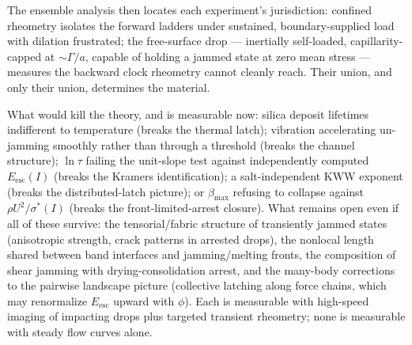 \documentclass[11pt]{article}
\newcommand{\sigmastar}{\sigma^{*}}
\begin{document}
The ensemble analysis then locates each experiment's jurisdiction: confined rheometry isolates the forward ladders under sustained, boundary-supplied load with dilation frustrated; the free-surface drop --- inertially self-loaded, capillarity-capped at $\sim\Gamma/a$, capable of holding a jammed state at zero mean stress --- measures the backward clock rheometry cannot cleanly reach. Their union, and only their union, determines the material.

What would kill the theory, and is measurable now: silica deposit lifetimes indifferent to temperature (breaks the thermal latch); vibration accelerating un-jamming smoothly rather than through a threshold (breaks the channel structure); $\ln\tau$ failing the unit-slope test against independently computed $E_{\mathrm{esc}}(I)$ (breaks the Kramers identification); a salt-independent KWW exponent (breaks the distributed-latch picture); or $\beta_{\max}$ refusing to collapse against $\rho U^{2}/\sigmastar(I)$ (breaks the front-limited-arrest closure). What remains open even if all of these survive: the tensorial/fabric structure of transiently jammed states (anisotropic strength, crack patterns in arrested drops), the nonlocal length shared between band interfaces and jamming/melting fronts, the composition of shear jamming with drying-consolidation arrest, and the many-body corrections to the pairwise landscape picture (collective latching along force chains, which may renormalize $E_{\mathrm{esc}}$ upward with $\phi$). Each is measurable with high-speed imaging of impacting drops plus targeted transient rheometry; none is measurable with steady flow curves alone.
\end{document}
